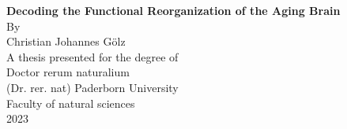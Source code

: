 \begin{titlepage}
    \begin{center}
        \vspace*{1cm}
        \LARGE
        \textbf{Decoding the Functional Reorganization of the Aging Brain}\\
        \vspace{1.5cm}
        \Large
        By\\
        \vspace{0.5cm}
        Christian Johannes Gölz\\
        \vspace{0.5cm}       
        A thesis presented for the degree of\\
        Doctor rerum naturalium\\
        (Dr. rer. nat)
        \vfill
        \Large
        Paderborn University\\
        Faculty of natural sciences\\
        2023
            
    \end{center}
\end{titlepage}

